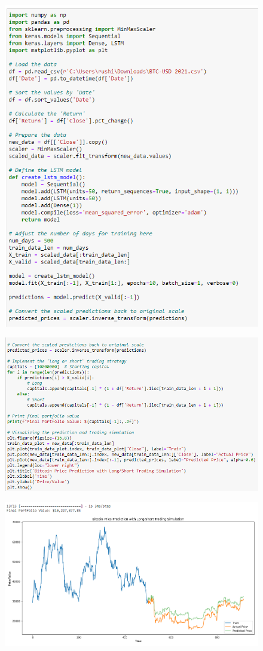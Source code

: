 \begin{figure}[H]
\centering
\includegraphics[scale=0.65]{fig32.jpg}
\end{figure}

\begin{figure}[H]
\centering
\includegraphics[scale=0.65]{fig33.jpg}
\end{figure}

\begin{figure}[H]
\centering
\includegraphics[scale=0.65]{fig34.jpg}
\end{figure}